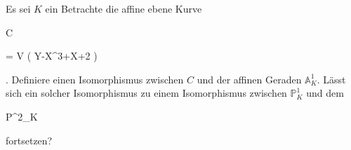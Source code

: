 {


Es sei $K$ ein
Betrachte die affine ebene Kurve


\mavergleichskettedisp

{\vergleichskette

{C
}

{ =} { V \left(  Y-X^3+X+2  \right)
}

{ } {
}

{ } {
}

{ } {
}

}
{}{}{.}
Definiere einen Isomorphismus zwischen $C$ und der affinen Geraden ${\mathbb A}^{1}_{ K }$. Lässt sich ein solcher Isomorphismus zu einem Isomorphismus zwischen ${\mathbb P}^{1}_{K}$ und dem


\mavergleichskette

{\vergleichskette

{ 
}

{ \subset }{ {\mathbb P}^{2}_{K}
}

{  }{
}

{    }{
}

{   }{
}

}
{}{}{}
fortsetzen?


}

{} {}





{}

